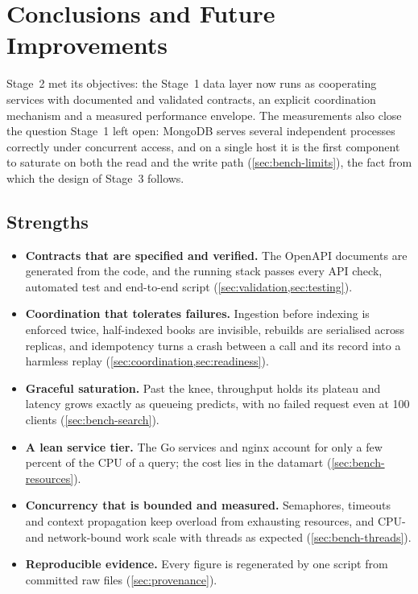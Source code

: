\documentclass[10pt,a4paper]{article}
\begin{document}
\section{Conclusions and Future Improvements}
\label{sec:conclusions}

Stage~2 met its objectives: the Stage~1 data layer now runs as cooperating
services with documented and validated contracts, an explicit coordination
mechanism and a measured performance envelope. The measurements also close the
question Stage~1 left open: MongoDB serves several independent processes
correctly under concurrent access, and on a single host it is the first
component to saturate on both the read and the write path
(\cref{sec:bench-limits}), the fact from which the design of Stage~3 follows.

\subsection{Strengths}
\label{sec:strengths}

\begin{itemize}
  \item \textbf{Contracts that are specified and verified.} The OpenAPI
  documents are generated from the code, and the running stack passes every API
  check, automated test and end-to-end script (\cref{sec:validation,sec:testing}).
  \item \textbf{Coordination that tolerates failures.} Ingestion before
  indexing is enforced twice, half-indexed books are invisible, rebuilds are
  serialised across replicas, and idempotency turns a crash between a call and
  its record into a harmless replay (\cref{sec:coordination,sec:readiness}).
  \item \textbf{Graceful saturation.} Past the knee, throughput holds its
  plateau and latency grows exactly as queueing predicts, with no failed
  request even at 100 clients (\cref{sec:bench-search}).
  \item \textbf{A lean service tier.} The Go services and nginx account for only
  a few percent of the CPU of a query; the cost lies in the datamart
  (\cref{sec:bench-resources}).
  \item \textbf{Concurrency that is bounded and measured.} Semaphores,
  timeouts and context propagation keep overload from exhausting resources,
  and CPU- and network-bound work scale with threads as expected
  (\cref{sec:bench-threads}).
  \item \textbf{Reproducible evidence.} Every figure is regenerated by one
  script from committed raw files (\cref{sec:provenance}).
\end{itemize}
\end{document}
